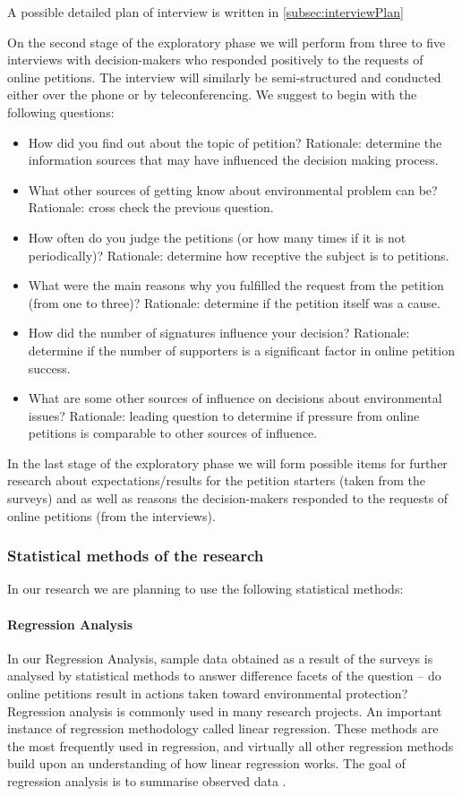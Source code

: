 A possible detailed plan of interview is written in \ref{subsec:interviewPlan} \par \vspace{0.2cm}
On the second stage of the exploratory phase we will perform from three to five interviews with decision-makers who responded positively to the requests of online petitions. The interview will similarly be semi-structured and conducted either over the phone or by teleconferencing. We suggest to begin with the following questions:
\begin{itemize}
\item How did you find out about the topic of petition? Rationale: determine the information sources that may have influenced the decision making process.
\item What other sources of getting know about environmental problem can be? Rationale: cross check the previous question.
\item How often do you judge the petitions (or how many times if it is not periodically)? Rationale: determine how receptive the subject is to petitions.
\item What were the main reasons why you fulfilled the request from the petition (from one to three)? Rationale: determine if the petition itself was a cause.
\item How did the number of signatures influence your decision? Rationale: determine if the number of supporters is a significant factor in online petition success.
\item What are some other sources of influence on decisions about environmental issues? Rationale: leading question to determine if pressure from online petitions is comparable to other sources of influence.
\end{itemize}

In the last stage of the exploratory phase we will form possible items for further research about expectations/results for the petition starters (taken from the surveys) and as well as reasons the decision-makers responded to the requests of online petitions (from the interviews).

\subsubsection{Statistical methods of the research}
In our research we are planning to use the following statistical methods:
\paragraph{Regression Analysis} In our Regression Analysis, sample data obtained as a result of the surveys is analysed by statistical methods to answer difference facets of the question -- do online petitions result in actions taken toward environmental protection? Regression analysis is commonly used in many research projects. An important instance of regression methodology called linear regression. These methods are the most frequently used in regression, and virtually all other regression methods build upon an understanding of how linear regression works. The goal of regression analysis is to summarise observed data \citep{Weisberg2005}. 

